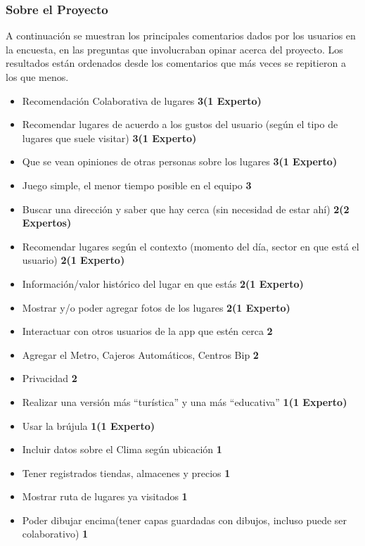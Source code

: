 \documentclass[10pt,letterpaper]{article}
\begin{document}
\subsubsection{Sobre el Proyecto}

A continuación se muestran los principales comentarios dados por los usuarios en la encuesta, en las preguntas que involucraban opinar acerca del proyecto. Los resultados están ordenados desde los comentarios que más veces se repitieron a los que menos.\\

\begin{itemize}
\item Recomendación Colaborativa de lugares \textbf{3(1 Experto)}
\item Recomendar lugares de acuerdo a los gustos del usuario (según el tipo de lugares que suele visitar)  \textbf{3(1 Experto)}
\item Que se vean opiniones de otras personas sobre los lugares \textbf{3(1 Experto)}
\item Juego simple, el menor tiempo posible en el equipo \textbf{3}
\item Buscar una dirección y saber que hay cerca (sin necesidad de estar ahí) \textbf{2(2 Expertos)}
\item Recomendar lugares según el contexto (momento del día, sector en que está el usuario) \textbf{2(1 Experto)}
\item Información/valor histórico del lugar en que estás \textbf{2(1 Experto)}
\item Mostrar y/o poder agregar fotos de los lugares \textbf{2(1 Experto)}
\item Interactuar con otros usuarios de la app que estén cerca \textbf{2}
\item Agregar el Metro, Cajeros Automáticos, Centros Bip \textbf{2}
\item Privacidad \textbf{2}
\item Realizar una versión más “turística” y una más “educativa” \textbf{1(1 Experto)}
\item Usar la brújula \textbf{1(1 Experto)}
\item Incluir datos sobre el Clima según ubicación \textbf{1}
\item Tener registrados tiendas, almacenes y precios \textbf{1}
\item Mostrar ruta de lugares ya visitados \textbf{1} 
\item Poder dibujar encima(tener capas guardadas con dibujos, incluso puede ser colaborativo) \textbf{1}
\end{itemize}
\end{document}
